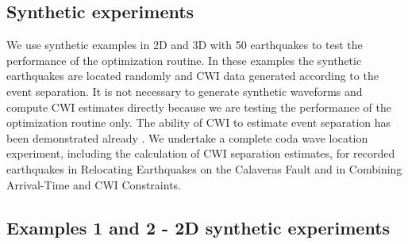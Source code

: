 \documentclass[12pt,double]{article}
\begin{document}
\vspace{2em}
\begin{centering}
\section*{Synthetic experiments}
\end{centering}

\label{sec:benchmarking}

We use synthetic examples in 2D and 3D with 50 earthquakes to test
the performance of the optimization routine. In these examples the
synthetic earthquakes are located randomly and CWI data generated
according to the event separation. It is not necessary to generate
synthetic waveforms and compute CWI estimates directly because we
are testing the performance of the optimization routine only. The
ability of CWI to estimate event separation has been demonstrated
already \citep{dr_Snieder05a, dr_Robinson07b, dr_Robinson11a}. We
undertake a complete coda wave location experiment, including the
calculation of CWI separation estimates, for recorded earthquakes in 
Relocating Earthquakes on the Calaveras 
Fault and in Combining Arrival-Time and CWI Constraints.

\vspace{1em}
\subsection*{Examples 1 and 2 - 2D synthetic experiments}
\end{document}
